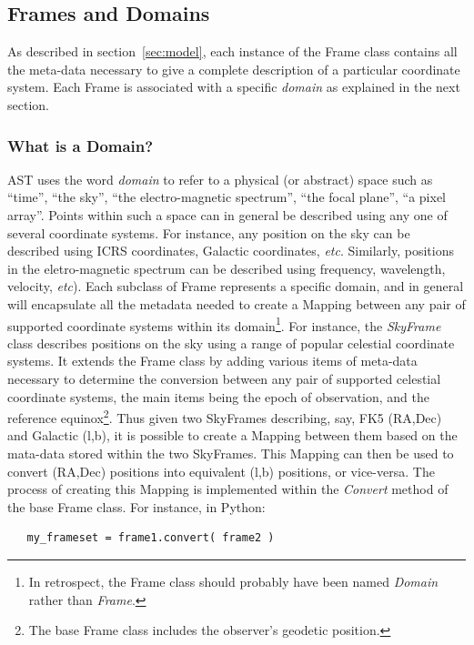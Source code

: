 \documentclass[final,authoryear,5p,times,twocolumn]{elsarticle}
\begin{document}
\subsection{Frames and Domains}
As described in section~\ref{sec:model}, each instance of the Frame class
contains all the meta-data necessary to give a complete description of
a particular coordinate system. Each Frame is associated with a specific
\emph{domain} as explained in the next section.

\subsubsection{What is a Domain?}
AST uses the word \emph{domain} to refer to a physical (or abstract)
space such as ``time'', ``the sky'', ``the electro-magnetic spectrum'',
``the focal plane'', ``a pixel array''. Points within such a space can in
general be described using any one of several coordinate systems. For
instance, any position on the sky can be described using ICRS
coordinates, Galactic coordinates, \emph{etc}. Similarly, positions in
the eletro-magnetic spectrum can be described using frequency,
wavelength, velocity, \emph{etc}). Each subclass of Frame represents a
specific domain, and in general will encapsulate all the metadata needed
to create a Mapping between any pair of supported coordinate systems
within its domain\footnote{In retrospect, the Frame
class should probably have been named \emph{Domain} rather than
\emph{Frame}.}. For instance, the \emph{SkyFrame} class describes positions
on the sky using a range of popular celestial coordinate systems. It extends
the Frame class by adding various items of meta-data necessary to
determine the conversion between any pair of supported celestial coordinate
systems, the main
items being the epoch of observation, and the reference
equinox\footnote{The base Frame class includes the observer's geodetic
position.}. Thus given two SkyFrames describing, say, FK5 (RA,Dec) and
Galactic (l,b), it is possible to create a Mapping between them based on
the mata-data stored within the two SkyFrames. This Mapping can then be
used to convert (RA,Dec) positions into equivalent (l,b) positions, or
vice-versa. The process of creating this Mapping is implemented within
the \emph{Convert} method of the base Frame class. For instance, in
Python:

\begin{verbatim}
   my_frameset = frame1.convert( frame2 )
\end{verbatim}
\end{document}
